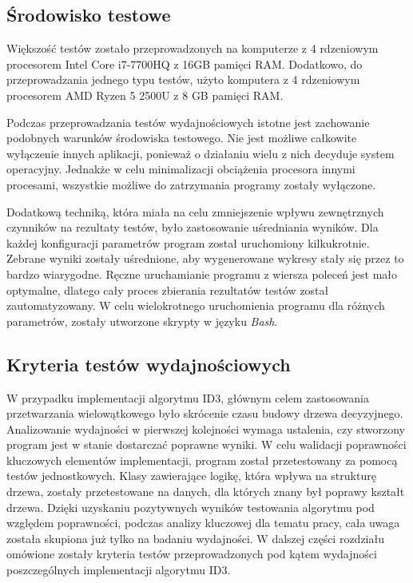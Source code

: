 \documentclass[12pt]{article}
\begin{document}
\subsection{Środowisko testowe}
Większość testów zostało przeprowadzonych na komputerze z 4 rdzeniowym procesorem Intel Core i7-7700HQ
z 16GB pamięci RAM. Dodatkowo, do przeprowadzania jednego typu testów, użyto komputera z 4 rdzeniowym procesorem AMD
Ryzen 5 2500U z 8 GB pamięci RAM.

Podczas przeprowadzania testów wydajnościowych istotne jest zachowanie podobnych warunków środowiska testowego.
Nie jest możliwe całkowite wyłączenie innych aplikacji, ponieważ o działaniu wielu z nich decyduje
system operacyjny. Jednakże w celu minimalizacji obciążenia procesora innymi procesami, wszystkie możliwe
do zatrzymania programy zostały wyłączone.

Dodatkową techniką, która miała na celu zmniejszenie wpływu zewnętrznych czynników na rezultaty testów,
było zastosowanie uśredniania wyników. Dla każdej konfiguracji parametrów program został uruchomiony kilkukrotnie.
Zebrane wyniki zostały uśrednione, aby wygenerowane wykresy stały się przez to bardzo wiarygodne.
Ręczne uruchamianie programu z wiersza poleceń jest mało optymalne, dlatego cały proces zbierania rezultatów testów
został zautomatyzowany. W celu wielokrotnego uruchomienia programu dla różnych parametrów, zostały utworzone
skrypty w języku \textit{Bash}.

\subsection{Kryteria testów wydajnościowych}

W przypadku implementacji algorytmu ID3, głównym celem zastosowania przetwarzania wielowątkowego było
skrócenie czasu budowy drzewa decyzyjnego. Analizowanie wydajności w pierwszej kolejności wymaga ustalenia, czy stworzony
program jest w stanie dostarczać poprawne wyniki.
W celu walidacji poprawności kluczowych elementów implementacji, program został przetestowany za
pomocą testów jednostkowych. Klasy zawierające logikę, która wpływa na strukturę drzewa, zostały przetestowane
na danych, dla których znany był poprawy kształt drzewa. Dzięki uzyskaniu pozytywnych wyników
testowania algorytmu pod względem poprawności, podczas analizy kluczowej dla tematu pracy, cała
uwaga została skupiona już tylko na badaniu wydajności.
W dalszej części rozdziału omówione zostały kryteria testów przeprowadzonych pod kątem wydajności
poszczególnych implementacji algorytmu ID3.
\end{document}

